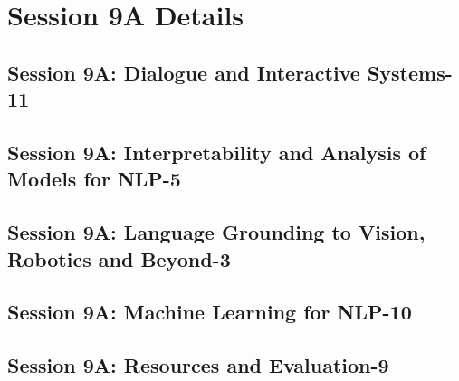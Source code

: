 \section{Session 9A Details}
\subsection{\large Session 9A: Dialogue and Interactive Systems-11}
\label{parallel-session-9A-trackA}
\TrackALoc\hfill\sessionchair{}{}
\clearpage
\subsection{\large Session 9A: Interpretability and Analysis of Models for NLP-5}
\label{parallel-session-9A-trackB}
\TrackBLoc\hfill\sessionchair{}{}
\clearpage
\subsection{\large Session 9A: Language Grounding to Vision, Robotics and Beyond-3}
\label{parallel-session-9A-trackC}
\TrackCLoc\hfill\sessionchair{}{}
\clearpage
\subsection{\large Session 9A: Machine Learning for NLP-10}
\label{parallel-session-9A-trackD}
\TrackDLoc\hfill\sessionchair{}{}
\clearpage
\subsection{\large Session 9A: Resources and Evaluation-9}
\label{parallel-session-9A-trackE}
\TrackELoc\hfill\sessionchair{}{}
\clearpage
